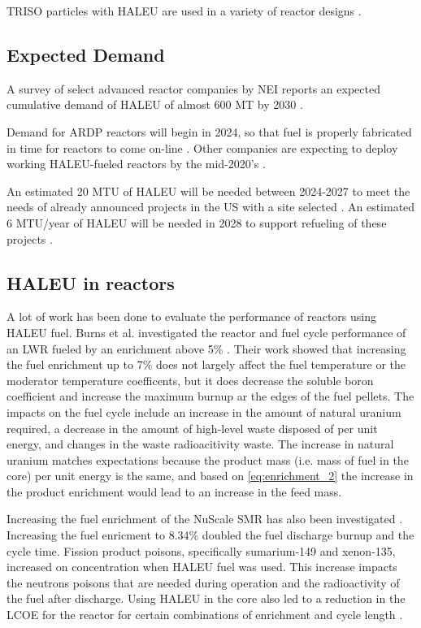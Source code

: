 \gls{TRISO} particles with \gls{HALEU} are used in a variety of reactor designs 
\cite{harlan_x-energy_2018,mitchell_usnc_2020,hussain_advances_2018}.

\subsection{Expected Demand}
A survey of select advanced reactor companies by \gls{NEI} reports an 
expected cumulative demand of \gls{HALEU} of almost 600 MT by 2030 
\cite{korsnick_need_2018}.

Demand for ARDP reactors will begin in 2024, so that fuel is 
properly fabricated in time for reactors to come on-line \cite{noauthor_establishing_2022}.
Other companies are expecting to deploy working \gls{HALEU}-fueled reactors 
by the mid-2020's \cite{noauthor_establishing_2022}.

An estimated 20 MTU of \gls{HALEU} will be needed between 2024-2027 to 
meet the needs of already announced projects in the US with a site 
selected \cite{noauthor_establishing_2022}. An estimated 6 MTU/year of 
\gls{HALEU} will be needed in 2028 to support refueling of these projects 
\cite{noauthor_establishing_2022}. 

\subsection{HALEU in reactors}
A lot of work has been done to evaluate the performance of reactors 
using \gls{HALEU} fuel. Burns et al. investigated the reactor and fuel cycle 
performance of an \gls{LWR} fueled by an enrichment above 5\% \cite{burns_reactor_2020}.
Their work showed that increasing the fuel enrichment up to 7\% does not 
largely affect the fuel temperature or the moderator temperature coefficents,
but it does decrease the soluble boron coefficient and increase the maximum 
burnup ar the edges of the fuel pellets. The impacts on the fuel cycle include 
an increase in the amount of natural uranium required, a decrease in the 
amount of high-level waste disposed of per unit energy, and changes in the 
waste radioacitivity waste. The increase in natural uranium matches 
expectations
because the product mass (i.e. mass of fuel in the core) per unit 
energy is the same, and 
based on \ref{eq:enrichment_2} the increase in the product enrichment would 
lead to an increase in the feed mass. 

Increasing the fuel enrichment of the NuScale \gls{SMR} has also been investigated 
\cite{carlson_implications_2022}. Increasing the fuel enricment to 8.34\% doubled the 
fuel discharge burnup and the cycle time. Fission product poisons, specifically 
sumarium-149 and xenon-135, increased on concentration when \gls{HALEU} fuel was used. 
This increase impacts the neutrons poisons that are needed during operation and the 
radioactivity of the fuel after discharge. Using \gls{HALEU} in the core also led 
to a reduction in the \gls{LCOE} for the reactor for certain combinations of 
enrichment and cycle length \cite{carlson_economic_2020,carlson_implications_2022}.

